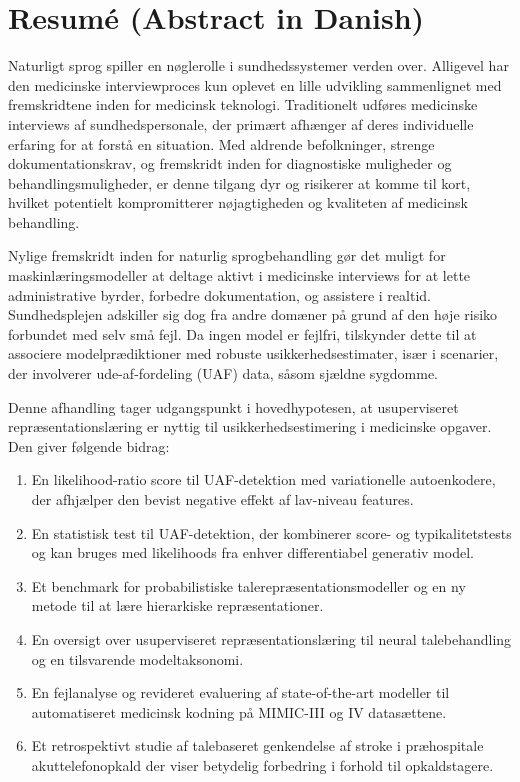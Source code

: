 
\chapter[resumé (abstract in danish)]{Resumé (Abstract in Danish)}

Naturligt sprog spiller en nøglerolle i sundhedssystemer verden over. Alligevel har den medicinske interviewproces kun oplevet en lille udvikling sammenlignet med fremskridtene inden for medicinsk teknologi.
Traditionelt udføres medicinske interviews af sundhedspersonale, der primært afhænger af deres individuelle erfaring for at forstå en situation.
Med aldrende befolkninger, strenge dokumentationskrav, og fremskridt inden for diagnostiske muligheder og behandlingsmuligheder, er denne tilgang dyr og risikerer at komme til kort, hvilket potentielt kompromitterer nøjagtigheden og kvaliteten af medicinsk behandling.

Nylige fremskridt inden for naturlig sprogbehandling gør det muligt for maskinlæringsmodeller at deltage aktivt i medicinske interviews for at lette administrative byrder, forbedre dokumentation, og assistere i realtid.
Sundhedsplejen adskiller sig dog fra andre domæner på grund af den høje risiko forbundet med selv små fejl. Da ingen model er fejlfri, tilskynder dette til at associere modelprædiktioner med robuste usikkerhedsestimater, især i scenarier, der involverer ude-af-fordeling (UAF) data, såsom sjældne sygdomme.

Denne afhandling tager udgangspunkt i hovedhypotesen, at usuperviseret repræsentationslæring er nyttig til usikkerhedsestimering i medicinske opgaver.
Den giver følgende bidrag:
%
\begin{enumerate}[topsep=3pt, partopsep=0pt, itemsep=3pt, parsep=0pt, leftmargin=2em, label=(\alph*)] %
    \item En likelihood-ratio score til UAF-detektion med variationelle autoenkodere, der afhjælper den bevist negative effekt af lav-niveau features.
    \item En statistisk test til UAF-detektion, der kombinerer score- og typikalitetstests og kan bruges med likelihoods fra enhver differentiabel generativ model.
    \item Et benchmark for probabilistiske talerepræsentationsmodeller og en ny metode til at lære hierarkiske repræsentationer.
    \item En oversigt over usuperviseret repræsentationslæring til neural talebehandling og en tilsvarende modeltaksonomi.
    \item En fejlanalyse og revideret evaluering af state-of-the-art modeller til automatiseret medicinsk kodning på MIMIC-III og IV datasættene.
    \item Et retrospektivt studie af talebaseret genkendelse af stroke i præhospitale akuttelefonopkald der viser betydelig forbedring i forhold til opkaldstagere.
\end{enumerate}
%

